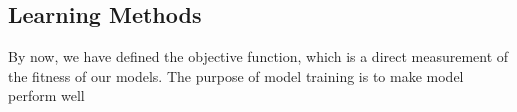 \subsection {Learning Methods}
By now, we have defined the objective function, which is a direct measurement of the fitness of our models. The purpose of model training is to make model perform well 